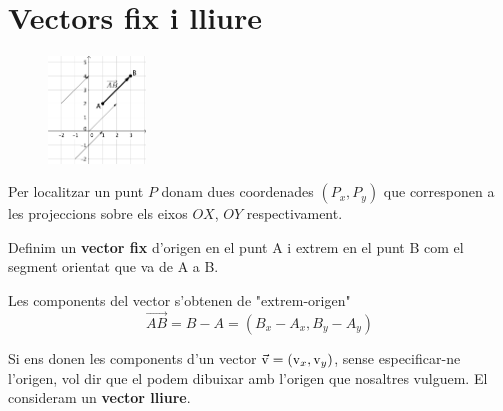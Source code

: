 \section{Vectors fix i lliure}
\begin{theorybox}
	 \begin{figure} 
		\vspace{-0.5cm}
		\begin{center}
			\includegraphics[width=0.23\textwidth]{img-08/vec-lliure}
		\end{center}
		\vspace{-1cm}
	\end{figure}
	Per localitzar un punt $P$ donam dues coordenades $(P_x, P_y)$ que corresponen a les projeccions sobre els eixos $OX$, $OY$ respectivament.
	
	Definim un \textbf{vector fix} d'origen en el punt A i extrem en el punt B com el segment orientat que va de A a B. 
	
	Les components del vector s'obtenen de "extrem-origen"
	\begin{equation*}
	\overrightarrow{AB}=B-A=(B_x-A_x, B_y-A_y)
	\end{equation*}
\end{theorybox}

\pagebreak

\begin{theorybox}
Si ens donen les components d'un vector $\vec{\mathrm{v}}=(\mathrm{v}_x, \mathrm{v}_y)$, sense especificar-ne l'origen, vol dir que el podem dibuixar amb l'origen que nosaltres vulguem. El consideram un \textbf{vector lliure}.
\end{theorybox}


